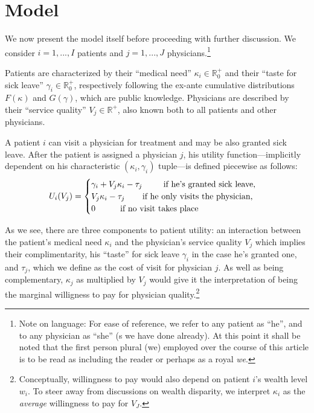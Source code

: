 \documentclass[../main.tex]{subfiles}
\begin{document}
\section{Model}

We now present the model itself before proceeding with further discussion. We consider $i = 1, ..., I$ patients and $j = 1, ..., J$ physicians.\footnote{Note on language: For ease of reference, we refer to any patient as ``he'', and to any physician as ``she'' (s we have done already). At this point it shall be noted that the first person plural (we) employed over the course of this article is to be read as including the reader or perhaps as a royal \textit{we}.}

Patients are characterized by their ``medical need'' $\kappa_i \in \mathbb{R}_0^+$ and their ``taste for sick leave'' $\gamma_i \in \mathbb{R}_0^+$, respectively following the ex-ante cumulative distributions $F(\kappa)$ and $G(\gamma)$, which are public knowledge. Physicians are described by their ``service quality'' $V_j \in \mathbb{R}^+$, also known both to all patients and other physicians.

A patient $i$ can visit a physician for treatment and may be also granted sick leave. After the patient is assigned a physician $j$, his utility function—implicitly dependent on his characteristic $(\kappa_i,\gamma_i)$ tuple—is defined piecewise as follows:
    \[
U_i(V_j) =\begin{cases}
\gamma_i + V_j \kappa_i - \tau_j \text{  \hspace{0.65cm} if he’s granted sick leave,} \\
V_j \kappa_i - \tau_j \text{  \hspace{0.5cm} if he only visits the physician,} \\
0 \text{  \hspace{0.8cm} if no visit takes place}
\end{cases}
\]

As we see, there are three components to patient utility: an interaction between the patient's medical need $\kappa_i$ and the physician's service quality $V_j$ which implies their complimentarity, his ``taste'' for sick leave $\gamma_i$ in the case he's granted one, and $\tau_j$, which we define as the cost of visit for physician $j$. As well as being complementary, $\kappa_j$ as multiplied by $V_j$ would give it the interpretation of being the marginal willigness to pay for physician quality.\footnote{Conceptually, willingness to pay would also depend on patient $i$'s wealth level $w_i$. To steer away from discussions on wealth disparity, we interpret $\kappa_i$ as the \textit{average} willingness to pay for $V_J$.}
\end{document}
